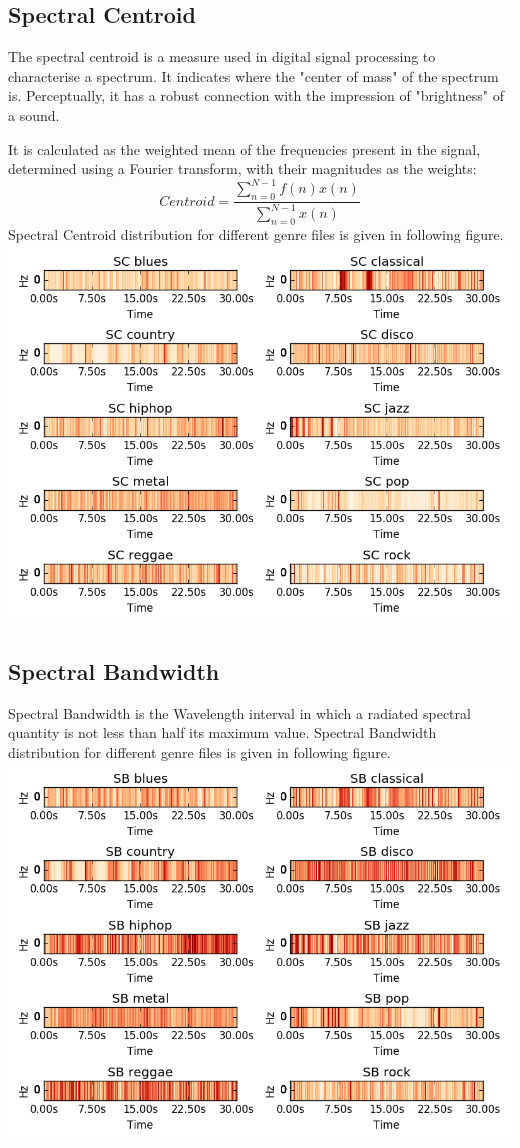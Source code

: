 \documentclass[conference]{IEEEtran}
\begin{document}
\subsection{Spectral Centroid}
The spectral centroid is a measure used in digital signal processing to characterise a spectrum. It indicates where the "center of mass" of the spectrum is. Perceptually, it has a robust connection with the impression of "brightness" of a sound.\cite{wiki}\par
It is calculated as the weighted mean of the frequencies present in the signal, determined using a Fourier transform, with their magnitudes as the weights:
\begin{equation}
    Centroid=\frac{\sum_{n=0}^{N-1}f(n)x(n)}{\sum_{n=0}^{N-1}x(n)}
\end{equation}
Spectral Centroid distribution for different genre files is given in following figure.\\
\includegraphics[width=\columnwidth]{SC_fig}
\subsection{Spectral Bandwidth}
Spectral Bandwidth is the Wavelength interval in which a radiated spectral quantity is not less than half its maximum value.
Spectral Bandwidth distribution for different genre files is given in following figure.\\
\includegraphics[width=\columnwidth]{SB_fig}
\end{document}
